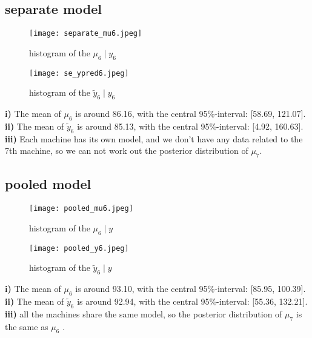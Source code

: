 \documentclass[article,11pt]{article}
\begin{document}
\subsection{separate model}
\begin{figure}[H]
	\centering
	\captionsetup{justification=centering}
	\texttt{[image: separate\_mu6.jpeg]}
	\caption{histogram of the $\mu_{6}\mid y_{6}$}
\end{figure}
\begin{figure}[H]
	\centering
	\captionsetup{justification=centering}
	\texttt{[image: se\_ypred6.jpeg]}
	\caption{histogram of the $\tilde{y}_{6}\mid y_{6}$}
\end{figure}
\textbf{i)} The mean of $\mu_{6}$ is around 86.16, with the central 95\%-interval: [58.69, 121.07].\\
\textbf{ii)} The mean of $\tilde{y}_{6}$ is around 85.13, with the central 95\%-interval: [4.92, 160.63].\\
\textbf{iii)} Each machine has its own model, and we don't have any data related to the 7th machine, so we can not work out the posterior distribution of $\mu_{7}$.\\



\subsection{pooled model}
\begin{figure}[H]
	\centering
	\captionsetup{justification=centering}
	\texttt{[image: pooled\_mu6.jpeg]}
	\caption{histogram of the $\mu_{6}\mid y$}
\end{figure}
\begin{figure}[H]
	\centering
	\captionsetup{justification=centering}
	\texttt{[image: pooled\_y6.jpeg]}
	\caption{histogram of the $\tilde{y}_{6}\mid y$}
\end{figure}
\textbf{i)} The mean of $\mu_{6}$ is around 93.10, with the central 95\%-interval: [85.95, 100.39].\\
\textbf{ii)} The mean of $\tilde{y}_{6}$ is around 92.94, with the central 95\%-interval: [55.36, 132.21].\\
\textbf{iii)} all the machines share the same model, so the posterior distribution of $\mu_{7}$ is the same as $\mu_{6}$ .\\


\end{document}
